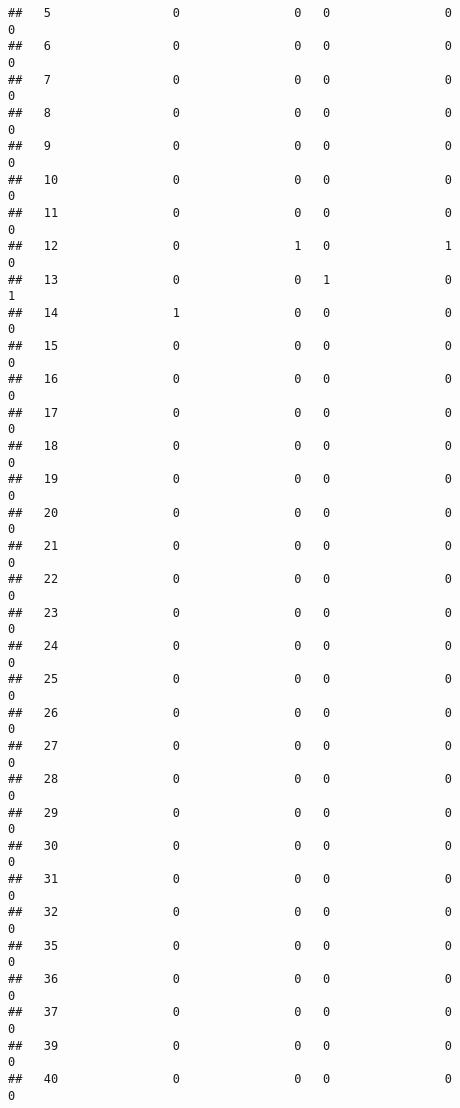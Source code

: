 \documentclass[]{article}
\begin{document}
\begin{verbatim}
##   5                 0                0   0                0                0
##   6                 0                0   0                0                0
##   7                 0                0   0                0                0
##   8                 0                0   0                0                0
##   9                 0                0   0                0                0
##   10                0                0   0                0                0
##   11                0                0   0                0                0
##   12                0                1   0                1                0
##   13                0                0   1                0                1
##   14                1                0   0                0                0
##   15                0                0   0                0                0
##   16                0                0   0                0                0
##   17                0                0   0                0                0
##   18                0                0   0                0                0
##   19                0                0   0                0                0
##   20                0                0   0                0                0
##   21                0                0   0                0                0
##   22                0                0   0                0                0
##   23                0                0   0                0                0
##   24                0                0   0                0                0
##   25                0                0   0                0                0
##   26                0                0   0                0                0
##   27                0                0   0                0                0
##   28                0                0   0                0                0
##   29                0                0   0                0                0
##   30                0                0   0                0                0
##   31                0                0   0                0                0
##   32                0                0   0                0                0
##   35                0                0   0                0                0
##   36                0                0   0                0                0
##   37                0                0   0                0                0
##   39                0                0   0                0                0
##   40                0                0   0                0                0

\end{verbatim}
\end{document}
